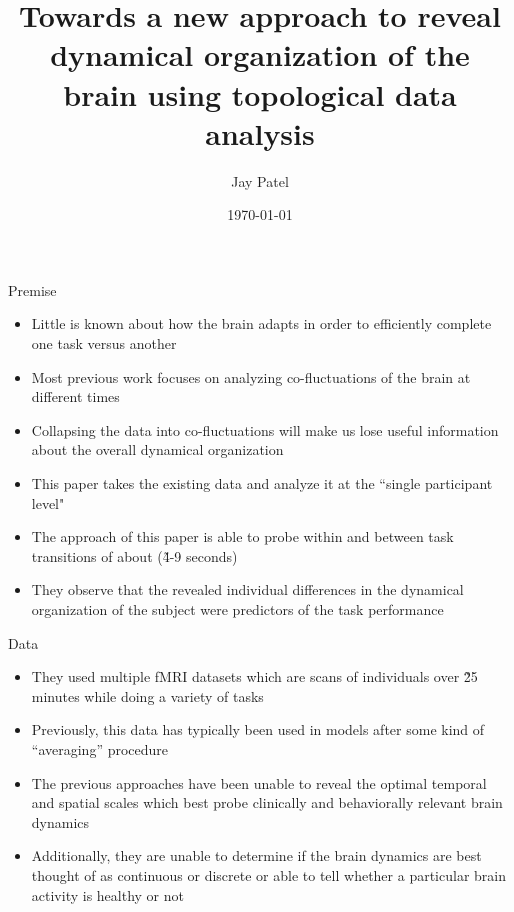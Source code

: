 \documentclass{beamer}
\title[Dynamical organization of brain using TDA]{Towards a new approach to reveal dynamical
organization of the brain using topological data analysis} %
\author{Jay Patel} %
\institute[OSU] %
{
The Ohio State University \\ %
\medskip
\textit{patel.3316@osu.edu} %
}
\date{\today} %
\begin{document}
\begin{frame}
    \nocite{mainpaper}
    \titlepage %
\end{frame}

\begin{frame}{Premise}
    \begin{itemize}
        \item Little is known about how the brain adapts in order to efficiently complete one task versus another \pause
        \item Most previous work focuses on analyzing co-fluctuations of the brain at different times \cite{oldDataCollapsed}\pause
        \item Collapsing the data into co-fluctuations will make us lose useful information about the overall dynamical organization \pause
        \item This paper takes the existing data and analyze it at the ``single participant level" \pause
        \item The approach of this paper is able to probe within and between task transitions of about (\~4-9 seconds) \pause
        \item They observe that the revealed individual differences in the dynamical organization of the subject were predictors of the task performance
    \end{itemize}
\end{frame}

\begin{frame}{Data}
    \begin{itemize}
        \item They used multiple fMRI datasets which are scans of individuals over \~25  minutes while doing a variety of tasks \pause
        \item Previously, this data has typically been used in models after some kind of ``averaging'' procedure \pause
        \item The previous approaches have been unable to reveal the optimal temporal and spatial scales which best probe clinically and behaviorally relevant brain dynamics \pause
        \item Additionally, they are unable to determine if the brain dynamics are best thought of as continuous or discrete or able to tell whether a particular brain activity is healthy or not
    \end{itemize}
\end{frame}
\end{document}
